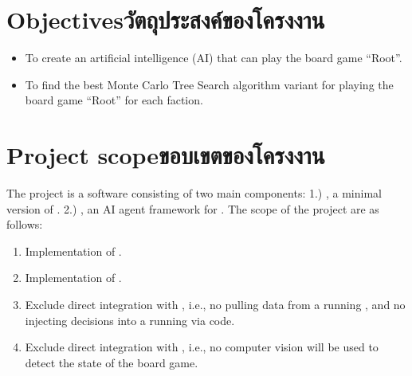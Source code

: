 


\section{\ifenglish Objectives\else วัตถุประสงค์ของโครงงาน\fi}
\begin{itemize}
    \item To create an artificial intelligence (AI) that can play the board game ``Root''.
    \item To find the best Monte Carlo Tree Search algorithm variant for playing the board game ``Root'' for each faction.
\end{itemize}

\section{\ifenglish Project scope\else ขอบเขตของโครงงาน\fi}
The project is a software consisting of two main components: 1.) \textit{\RootOurs{}}, a minimal version of \RootV{}. 2.) \textit{\RootAI{}}, an AI agent framework for \RootOurs{}. The scope of the project are as follows:
\begin{enumerate}
    \item Implementation of \RootOurs{}.
    \item Implementation of \RootAI{}.
    \item Exclude direct integration with \RootV{}, i.e., no pulling data from a running \RootV{}, and no injecting decisions into a running \RootV{} via code.
    \item Exclude direct integration with \RootB{}, i.e., no computer vision will be used to detect the state of the board game.
\end{enumerate}

